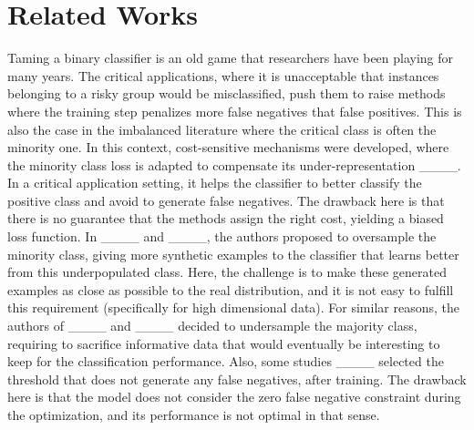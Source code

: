 \section{Related Works}
\label{Related Works}


Taming a binary classifier is an old game that researchers have been playing for many years. The critical applications, where it is unacceptable that instances belonging to a risky group would be misclassified, push them to raise methods where the training step penalizes more false negatives that false positives. This is also the case in the imbalanced literature where the critical class is often the minority one. In this context, cost-sensitive mechanisms were developed, where the minority class loss is adapted to compensate its under-representation ____. In a critical application setting, it helps the classifier to better classify the positive class and avoid to generate false negatives. The drawback here is that there is no guarantee that the methods assign the right cost, yielding a biased loss function. In ____ and ____, the authors proposed to oversample the minority class, giving more synthetic examples to the classifier that learns better from this underpopulated class. Here, the challenge is to make these generated examples as close as possible to the real distribution, and it is not easy to fulfill this requirement (specifically for high dimensional data). For similar reasons, the authors of ____ and ____ decided to undersample the majority class, requiring to sacrifice informative data that would eventually be interesting to keep for the classification performance. Also, some studies ____ selected the threshold that does not generate any false negatives, after training. The drawback here is that the model does not consider the zero false negative constraint during the optimization, and its performance is not optimal in that sense. 

